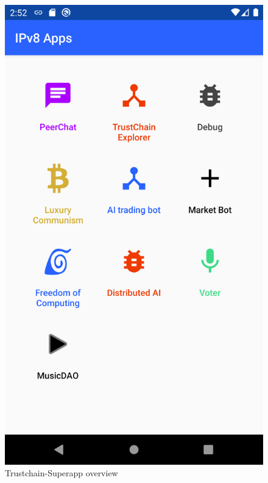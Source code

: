 \begin{figure}
        \includegraphics[width=1\linewidth]{related-work/screenshot-superapp.png}
        \caption{Trustchain-Superapp overview}
        \label{fig:trustchain-superapp}
    \endminipage\hfill

\end{figure}
